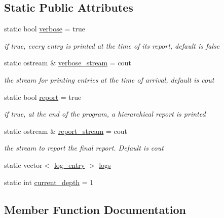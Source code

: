 \subsection*{Static Public Attributes}
\begin{DoxyCompactItemize}
\item 
static bool \hyperlink{classlogger_aab3c778c044ddf4b1b5fad8f4c230ff9}{verbose} = true
\begin{DoxyCompactList}\small\item\em if true, every entry is printed at the time of its report, default is false \end{DoxyCompactList}\item 
static ostream \& \hyperlink{classlogger_aec58cd6310ffb9939f8509daf1fcfbf8}{verbose\+\_\+stream} = cout
\begin{DoxyCompactList}\small\item\em the stream for printing entries at the time of arrival, default is cout \end{DoxyCompactList}\item 
static bool \hyperlink{classlogger_adbcc380b0ef53e23125f91e1c8f13f4e}{report} = true
\begin{DoxyCompactList}\small\item\em if true, at the end of the program, a hierarchical report is printed \end{DoxyCompactList}\item 
static ostream \& \hyperlink{classlogger_a8490b3400a43c9c6f3cc3cc122f10996}{report\+\_\+stream} = cout
\begin{DoxyCompactList}\small\item\em the stream to report the final report. Default is cout \end{DoxyCompactList}\item 
static vector$<$ \hyperlink{classlog__entry}{log\+\_\+entry} $>$ \hyperlink{classlogger_a46e89697a97bc41a90ec78763bfe4d39}{logs}
\item 
static int \hyperlink{classlogger_a9d29b49bd318a719a8e85b59eac54fe0}{current\+\_\+depth} = 1
\end{DoxyCompactItemize}


\subsection{Member Function Documentation}
\mbox{\label{classlogger_a710163deb17bc81f70d53d285b8ac9ac}} 
